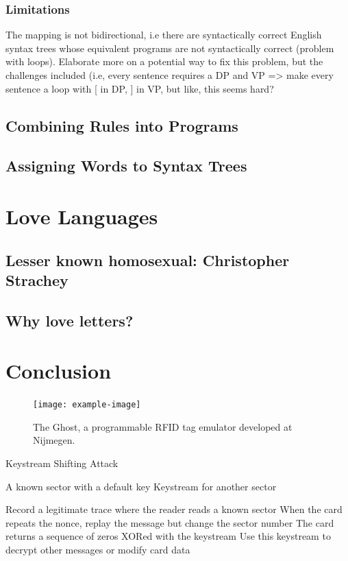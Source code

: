 \documentclass[runningheads]{llncs}
\begin{document}
\subsubsection{Limitations} %
The mapping is not bidirectional, i.e there are syntactically correct English syntax trees whose equivalent programs are not syntactically correct (problem with loops). Elaborate more on a potential way to fix this problem, but the challenges included (i.e, every sentence requires a DP and VP => make every sentence a loop with [ in DP, ] in VP, but like, this seems hard?
\subsection{Combining Rules into Programs}
\subsection{Assigning Words to Syntax Trees}

\section{Love Languages}
\subsection{Lesser known homosexual: Christopher Strachey}
\subsection{Why love letters?}

\section{Conclusion}

\lipsum[5]
\begin{figure}
  \centering
  \texttt{[image: example-image]}
  \caption{The Ghost, a programmable RFID tag emulator developed at Nijmegen.}
  \label{fig:ghost}
\end{figure}

\newpage
\lipsum[5]

\begin{algorithm}[H]
\caption{Keystream Shifting Attack}
\label{alg:keystream}

\begin{algorithmic}[1] %
	\Require  A known sector with a default key
  \Ensure Keystream for another sector

  \State Record a legitimate trace where the reader reads a known sector
	\EndIf
  \State When the card repeats the nonce, replay the message but change the sector number
  \State The card returns a sequence of zeros XORed with the keystream
  \State Use this keystream to decrypt other messages or modify card data
\end{algorithmic}
\end{algorithm}
\end{document}
